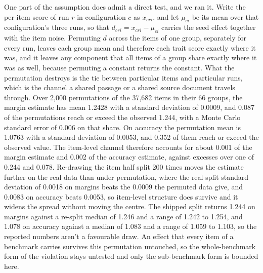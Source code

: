 One part of the assumption does admit a direct test, and we ran it. Write the per-item score of run $r$ in configuration $c$ as $x_{cri}$, and let $\mu_{ci}$ be its mean over that configuration's three runs, so that $d_{cri}=x_{cri}-\mu_{ci}$ carries the seed effect together with the item noise. Permuting $d$ across the items of one group, separately for every run, leaves each group mean and therefore each trait score exactly where it was, and it leaves any component that all items of a group share exactly where it was as well, because permuting a constant returns the constant. What the permutation destroys is the tie between particular items and particular runs, which is the channel a shared passage or a shared source document travels through. Over 2,000 permutations of the 37,682 items in their 66 groups, the margin estimate has mean 1.2428 with a standard deviation of 0.0009, and 0.087 of the permutations reach or exceed the observed 1.244, with a Monte Carlo standard error of 0.006 on that share. On accuracy the permutation mean is 1.0763 with a standard deviation of 0.0053, and 0.352 of them reach or exceed the observed value. The item-level channel therefore accounts for about 0.001 of the margin estimate and 0.002 of the accuracy estimate, against excesses over one of 0.244 and 0.078. Re-drawing the item half split 200 times moves the estimate further on the real data than under permutation, where the real split standard deviation of 0.0018 on margins beats the 0.0009 the permuted data give, and 0.0083 on accuracy beats 0.0053, so item-level structure does survive and it widens the spread without moving the centre. The shipped split returns 1.244 on margins against a re-split median of 1.246 and a range of 1.242 to 1.254, and 1.078 on accuracy against a median of 1.083 and a range of 1.059 to 1.103, so the reported numbers aren't a favourable draw. An effect that every item of a benchmark carries survives this permutation untouched, so the whole-benchmark form of the violation stays untested and only the sub-benchmark form is bounded here.

